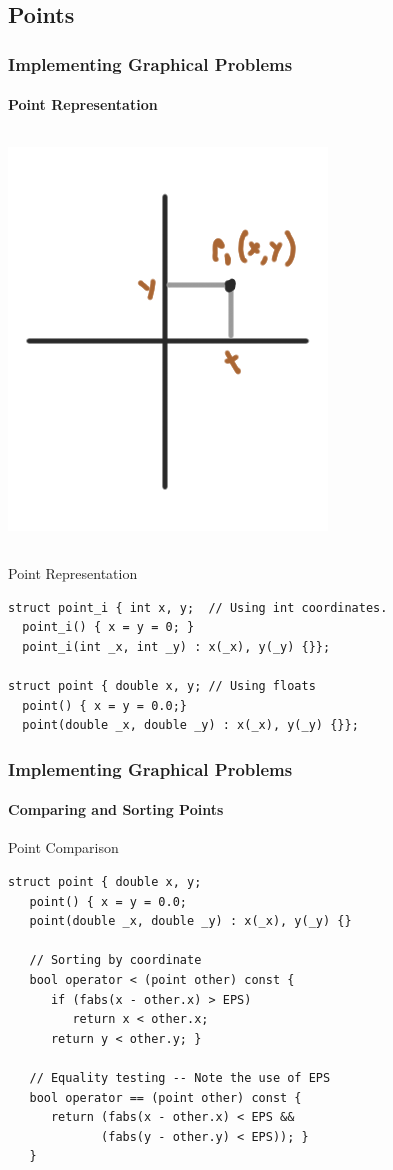 \documentclass{beamer}
\begin{document}
\subsection{Points}
\begin{frame}[fragile]
  \frametitle{Implementing Graphical Problems}
  \framesubtitle{Point Representation}

  {\smaller
    \begin{columns}
      \includegraphics[width=.65\textwidth]{../img/geom2}
    \end{columns}

    \begin{exampleblock}{Point Representation}
\begin{verbatim}
struct point_i { int x, y;  // Using int coordinates.
  point_i() { x = y = 0; }
  point_i(int _x, int _y) : x(_x), y(_y) {}};

struct point { double x, y; // Using floats
  point() { x = y = 0.0;}
  point(double _x, double _y) : x(_x), y(_y) {}};
\end{verbatim}
    \end{exampleblock}
  }
\end{frame}

\begin{frame}[fragile]
  \frametitle{Implementing Graphical Problems}
  \framesubtitle{Comparing and Sorting Points}

  {\smaller

    \begin{exampleblock}{Point Comparison}
\begin{verbatim}
struct point { double x, y;
   point() { x = y = 0.0;
   point(double _x, double _y) : x(_x), y(_y) {}

   // Sorting by coordinate
   bool operator < (point other) const {
      if (fabs(x - other.x) > EPS)
         return x < other.x;
      return y < other.y; }

   // Equality testing -- Note the use of EPS
   bool operator == (point other) const {
      return (fabs(x - other.x) < EPS &&
             (fabs(y - other.y) < EPS)); }
   }
\end{verbatim}
    \end{exampleblock}
  }
\end{frame}
\end{document}
